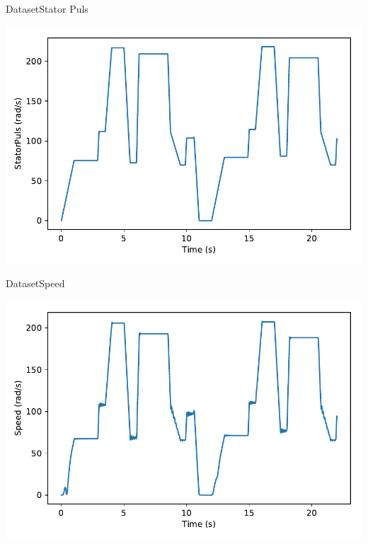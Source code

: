 \documentclass[handout]{beamer}
\begin{document}
\begin{frame}{Dataset}{Stator Puls}
\begin{center}
  \includegraphics[scale=0.6]{images/statorpuls_vs_time}
\end{center}
\end{frame}

\begin{frame}{Dataset}{Speed}
\begin{center}
  \includegraphics[scale=0.6]{images/speed_vs_time}
\end{center}
\end{frame}
\end{document}
